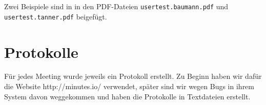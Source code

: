\documentclass[10pt,a4paper]{scrartcl}
\begin{document}
Zwei Beispiele sind in in den PDF-Dateien \texttt{usertest.\-baumann.\-pdf} und
\texttt{usertest.\-tanner.\-pdf} beigefügt.

\section{Protokolle}

Für jedes Meeting wurde jeweils ein Protokoll erstellt. Zu Beginn haben wir dafür die Website
http://minutes.io/ verwendet, später sind wir wegen Bugs in ihrem System davon weggekommen und haben
die Protokolle in Textdateien erstellt.




\end{document}
